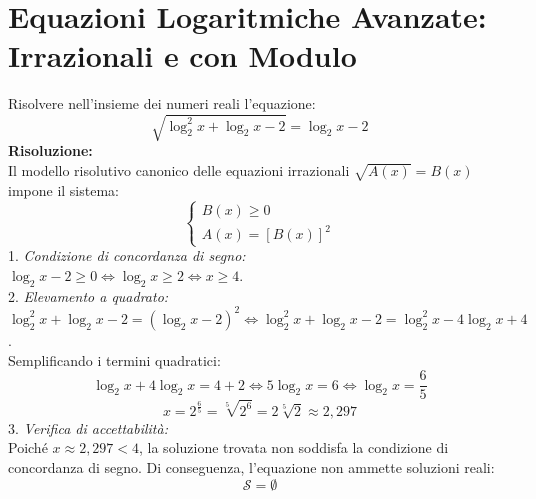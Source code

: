 \documentclass[11pt,a4paper,oneside]{report}
\begin{document}
\section{Equazioni Logaritmiche Avanzate: Irrazionali e con Modulo}

\begin{esercizio}
Risolvere nell'insieme dei numeri reali l'equazione:
\begin{equation}
\sqrt{\log_2^2 x + \log_2 x - 2} = \log_2 x - 2
\end{equation}
\textbf{Risoluzione:}\\
Il modello risolutivo canonico delle equazioni irrazionali $\sqrt{A(x)} = B(x)$ impone il sistema:
\begin{equation}
\begin{cases}
B(x) \ge 0\\
A(x) = [B(x)]^2
\end{cases}
\end{equation}
1. \textit{Condizione di concordanza di segno:}\\
$\log_2 x - 2 \ge 0 \iff \log_2 x \ge 2 \iff x \ge 4$.\\
2. \textit{Elevamento a quadrato:}\\
$\log_2^2 x + \log_2 x - 2 = (\log_2 x - 2)^2 \iff \log_2^2 x + \log_2 x - 2 = \log_2^2 x - 4\log_2 x + 4$.\\
Semplificando i termini quadratici:
\begin{equation}
\log_2 x + 4\log_2 x = 4 + 2 \iff 5\log_2 x = 6 \iff \log_2 x = \frac{6}{5}
\end{equation}
\begin{equation}
x = 2^{\frac{6}{5}} = \sqrt[5]{2^6} = 2\sqrt[5]{2} \approx 2{,}297
\end{equation}
3. \textit{Verifica di accettabilit\`a:}\\
Poich\'e $x \approx 2{,}297 < 4$, la soluzione trovata non soddisfa la condizione di concordanza di segno. Di conseguenza, l'equazione non ammette soluzioni reali:
\begin{equation}
\mathcal{S} = \emptyset
\end{equation}
\end{esercizio}
\end{document}

